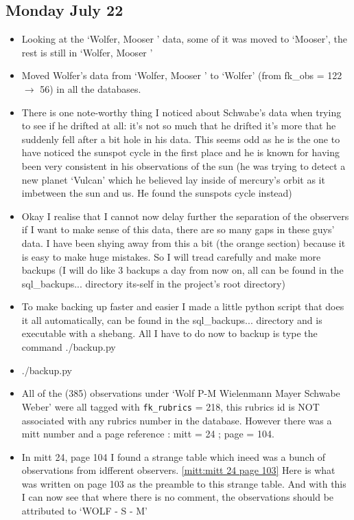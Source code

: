 \documentclass[12pt]{article}
\begin{document}
\subsection{Monday July 22}
\begin{itemize}
    \item Looking at the `Wolfer, Mooser ' data, some of it was moved to `Mooser', the rest is still in `Wolfer, Mooser '
    \item Moved Wolfer's data from `Wolfer, Mooser ' to `Wolfer' (from fk\_obs = 122 $\to$ 56) in all the databases.
    \item There is one note-worthy thing I noticed about Schwabe's data when trying to see if he drifted at all: it's not so much that he drifted it's more that he suddenly fell after a bit hole in his data. This seems odd as he is the one to have noticed the sunspot cycle in the first place and he is known for having been very consistent in his observations of the sun (he was trying to detect a new planet `Vulcan' which he believed lay inside of mercury's orbit as it imbetween the sun and us. He found the sunspots cycle instead)
    \item Okay I realise that I cannot now delay further the separation of the observers if I want to make sense of this data, there are so many gaps in these guys' data. I have been shying away from this a bit (the orange section) because it is easy to make huge mistakes. So I will tread carefully and make more backups (I will do like 3 backups a day from now on, all can be found in the sql\_backups... directory its-self in the project's root directory)
    \item To make backing up faster and easier I made a little python script that does it all automatically, can be found in the sql\_backups... directory and is executable with a shebang. All I have to do now to backup is type the command ./backup.py
    \item ./backup.py
    \item All of the (385) observations under `Wolf P-M Wielenmann Mayer Schwabe Weber' were all tagged with \texttt{fk\_rubrics} = 218, this rubrics id is NOT associated with any rubrics number in the database. However there was a mitt number and a page reference : mitt = 24 ; page = 104. 
    \item In mitt 24, page 104 I found a strange table which ineed was a bunch of observations from idfferent observers. \ref{mitt:mitt 24 page 103} Here is what was written on page 103 as the preamble to this strange table. And with this I can now see that where there is no comment, the observations should be attributed to `WOLF - S - M'

\end{itemize}
\end{document}
